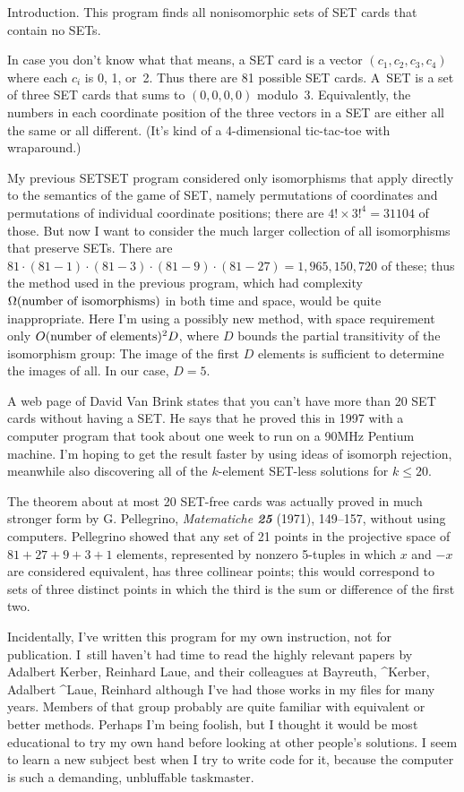 
\datethis
\def\SET/{{\mc SET\null}}


Introduction. This program finds all nonisomorphic sets of \SET/ cards
that contain no \SET/s.

In case you don't know what that means, a \SET/ card is a vector
$(c_1,c_2,c_3,c_4)$ where each $c_i$ is 0, 1, or~2. Thus there are 81
possible \SET/ cards. A~\SET/ is a set of three \SET/ cards that sums
to $(0,0,0,0)$ modulo~3. Equivalently, the numbers in each coordinate
position of the three vectors in a \SET/ are either all the same or all
different. (It's kind of a 4-dimensional tic-tac-toe with wraparound.)

My previous {\sc SETSET} program considered only isomorphisms that
apply directly to the semantics of the game of \SET/, namely
permutations of coordinates and permutations of individual coordinate
positions; there are $4!\times 3!^4=31104$ of those. But now I want
to consider the much larger collection of all isomorphisms that
preserve \SET/s. There are $81\cdot(81-1)\cdot(81-3)\cdot(81-9)\cdot(81-27)
=1{,}965{,}150{,}720$ of these; thus the method used in the
previous program, which had complexity $\Omega(\hbox{number of isomorphisms})$
in both time and space, would be quite inappropriate. Here I'm using
a possibly new method, with space requirement only
$O(\hbox{number of elements})^2D$, where $D$ bounds the partial
transitivity of the isomorphism group: The image of the first $D$ elements
is sufficient to determine the images of all. In our case, $D=5$.

A web page of David Van Brink states that you can't have more than 20 \SET/
cards without having a \SET/. He says that he proved this in 1997 with a
computer program that took about one week to run on a 90MHz Pentium machine.
I'm hoping to get the result faster by using ideas of isomorph rejection,
meanwhile also discovering all of the $k$-element \SET/-less solutions
for $k\le20$.

The theorem about at most 20 \SET/-free cards was actually proved in much
stronger form by G. Pellegrino, {\sl Matematiche\/ \bf25} (1971), 149--157,
without using computers. Pellegrino showed that any set of 21 points in
the projective space of $81+27+9+3+1$ elements, represented by nonzero
5-tuples in which $x$ and $-x$ are considered equivalent, has three
collinear points; this would correspond to sets of three distinct points
in which the third is the sum or difference of the first two.

Incidentally, I've written this program for my own instruction, not for
publication. I~still haven't had time to read the highly relevant
papers by Adalbert Kerber, Reinhard Laue, and their colleagues at Bayreuth,
^{Kerber, Adalbert}
^{Laue, Reinhard}
although I've
had those works in my files for many years. Members of that group
probably are quite familiar with equivalent or better methods.
Perhaps I'm being foolish, but I thought it would be most educational to try
my own hand before looking at other people's solutions. I seem to learn a new
subject best when I try to write code for it, because the computer is
such a demanding, unbluffable taskmaster.

